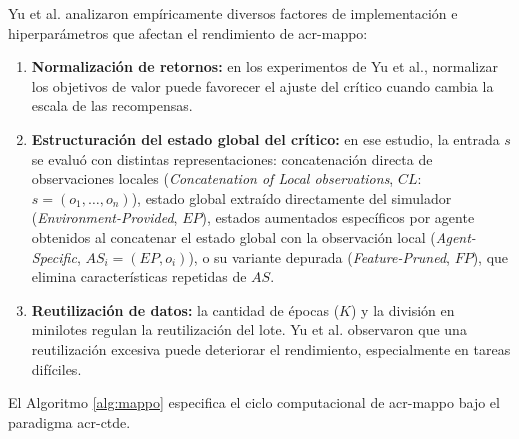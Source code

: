 Yu et al. \cite{yu2022surprising} analizaron empíricamente diversos factores de implementación e hiperparámetros que afectan el rendimiento de \acrshort{acr-mappo}:
\begin{enumerate}
    \item \textbf{Normalización de retornos:} en los experimentos de Yu et al., normalizar los objetivos de valor puede favorecer el ajuste del crítico cuando cambia la escala de las recompensas.
    \item \textbf{Estructuración del estado global del crítico:} en ese estudio, la entrada $s$ se evaluó con distintas representaciones: concatenación directa de observaciones locales (\textit{Concatenation of Local observations}, $CL$: $s = (o_1, \dots, o_n)$), estado global extraído directamente del simulador (\textit{Environment-Provided}, $EP$), estados aumentados específicos por agente obtenidos al concatenar el estado global con la observación local (\textit{Agent-Specific}, $AS_i = (EP, o_i)$), o su variante depurada (\textit{Feature-Pruned}, $FP$), que elimina características repetidas de $AS$.
    \item \textbf{Reutilización de datos:} la cantidad de épocas ($K$) y la división en minilotes regulan la reutilización del lote. Yu et al. observaron que una reutilización excesiva puede deteriorar el rendimiento, especialmente en tareas difíciles.
\end{enumerate}

El Algoritmo \ref{alg:mappo} especifica el ciclo computacional de \acrshort{acr-mappo} bajo el paradigma \acrshort{acr-ctde}.


